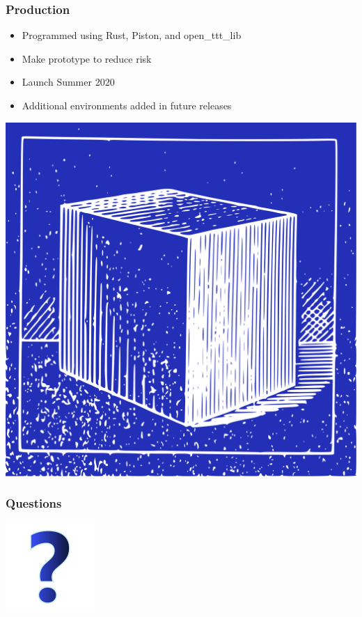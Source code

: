 \documentclass{beamer}
\begin{document}
\begin{frame}
  \frametitle{Production}

  \begin{itemize}
    \item Programmed using Rust, Piston, and open\_ttt\_lib
    \item Make prototype to reduce risk
    \item Launch Summer 2020
    \item Additional environments added in future releases
  \end{itemize}

  \begin{center}
    \vspace{1em}
    \includegraphics[height=0.40\textheight]{img/clip-art/blueprint-cube}
  \end{center}

\end{frame}


\begin{frame}
  \frametitle{Questions}

  \begin{center}
    \includegraphics[height=0.50\textheight]{img/clip-art/question-mark}
  \end{center}

\end{frame}
\end{document}
